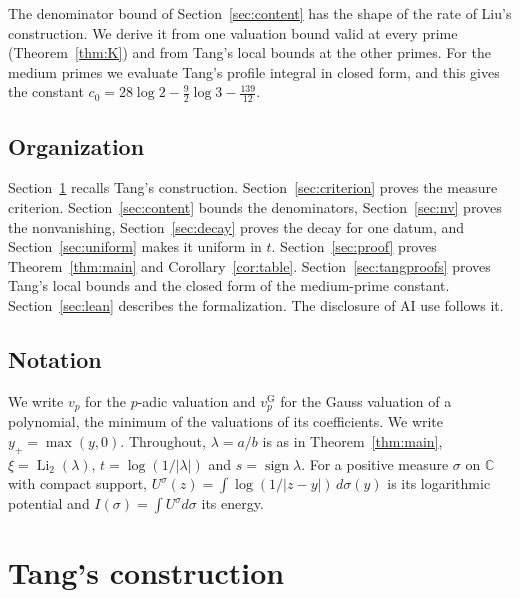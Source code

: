 \documentclass[11pt]{amsart}
\theoremstyle{definition}
\theoremstyle{remark}
\numberwithin{equation}{section}
\newcommand{\C}{\mathbb C}
\newcommand{\Li}{\operatorname{Li}}
\newcommand{\vG}{v_p^{\mathrm G}}
\begin{document}
The denominator bound of Section~\ref{sec:content} has the shape of the rate of Liu's construction. We derive it from
one valuation bound valid at every prime (Theorem~\ref{thm:K}) and from Tang's local bounds at the other primes. For
the medium primes we evaluate Tang's profile integral in closed form, and this gives the constant
$c_0=28\log2-\frac92\log3-\frac{139}{12}$.

\subsection{Organization}
Section~\ref{sec:construction} recalls Tang's construction. Section~\ref{sec:criterion} proves the measure criterion.
Section~\ref{sec:content} bounds the denominators, Section~\ref{sec:nv} proves the nonvanishing, Section~\ref{sec:decay}
proves the decay for one datum, and Section~\ref{sec:uniform} makes it uniform in $t$. Section~\ref{sec:proof} proves
Theorem~\ref{thm:main} and Corollary~\ref{cor:table}. Section~\ref{sec:tangproofs} proves Tang's local bounds and the
closed form of the medium-prime constant. Section~\ref{sec:lean} describes the formalization. The disclosure of AI use
follows it.

\subsection{Notation}
We write $v_p$ for the $p$-adic valuation and $\vG$ for the Gauss valuation of a polynomial, the minimum of the
valuations of its coefficients. We write $y_+=\max(y,0)$. Throughout, $\lambda=a/b$ is as in Theorem~\ref{thm:main},
$\xi=\Li_2(\lambda)$, $t=\log(1/|\lambda|)$ and $s=\operatorname{sign}\lambda$. For a positive measure $\sigma$ on $\C$
with compact support, $U^\sigma(z)=\int\log(1/|z-y|)\,d\sigma(y)$ is its logarithmic potential and
$I(\sigma)=\int U^\sigma d\sigma$ its energy.

\section{Tang's construction}\label{sec:construction}
\end{document}
